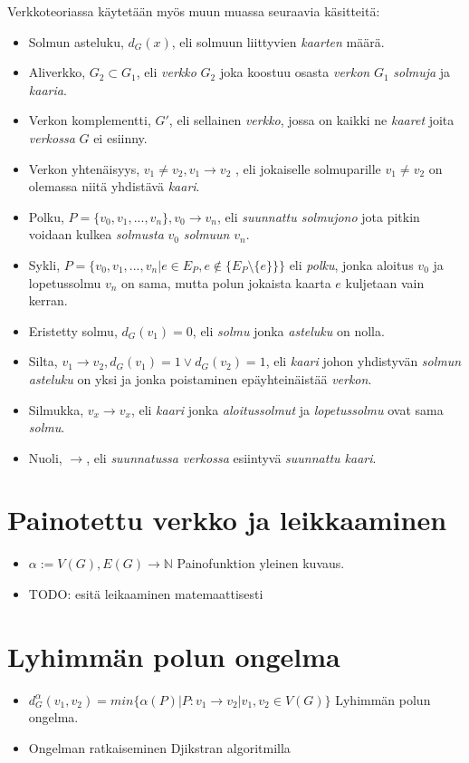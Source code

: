   Verkkoteoriassa käytetään myös muun muassa seuraavia käsitteitä:
  \begin{itemize}
    \item Solmun asteluku, \(d_G(x)\), eli solmuun liittyvien \emph{kaarten} määrä.
    \item Aliverkko, \(G_2 \subset G_1\), eli \emph{verkko} \(G_2\) joka koostuu osasta \emph{verkon} \(G_1\) \emph{solmuja} ja \emph{kaaria}.
    \item Verkon komplementti, \(G'\), eli sellainen \emph{verkko}, jossa on kaikki ne \emph{kaaret} joita \emph{verkossa} \(G\) ei esiinny.
    \item Verkon yhtenäisyys, \(v_1 \neq v_2, v_1 \rightarrow v_2\) , eli jokaiselle solmuparille \(v_1 \neq v_2\) on olemassa niitä yhdistävä \emph{kaari}.
    \item Polku, \(P = \{v_0, v_1, ..., v_n\}, v_0 \rightarrow v_n\), eli \emph{suunnattu solmujono} jota pitkin voidaan kulkea \emph{solmusta} \(v_0\) \emph{solmuun} \(v_n\).
    \item Sykli, \(P = \{v_0, v_1, ..., v_n| e \in E_P, e \notin \{E_P \setminus \{e\} \}\}\) eli \emph{polku}, jonka aloitus \(v_0\) ja lopetussolmu \(v_n\) on sama, mutta polun jokaista kaarta \(e\) kuljetaan vain kerran.
    \item Eristetty solmu, \(d_G(v_1) = 0\), eli \emph{solmu} jonka \emph{asteluku} on nolla.
    \item Silta, \(v_1 \rightarrow v_2, d_G(v_1) = 1 \lor d_G(v_2) = 1\), eli \emph{kaari} johon yhdistyvän \emph{solmun asteluku} on yksi ja jonka poistaminen epäyhteinäistää \emph{verkon}.
    \item Silmukka, \(v_x \rightarrow v_x\), eli \emph{kaari} jonka \emph{aloitussolmut} ja \emph{lopetussolmu} ovat sama \emph{solmu}.
    \item Nuoli, \(\rightarrow\), eli \emph{suunnatussa verkossa} esiintyvä \emph{suunnattu kaari}.
  \end{itemize}

\section{Painotettu verkko ja leikkaaminen} \label{ch:09_painotettu_verkko_ja_leikkaaminen}

  \begin{itemize}
    \item \(\alpha := V(G), E(G) \rightarrow \mathbb{N}\) Painofunktion yleinen kuvaus.
    \item TODO: esitä leikaaminen matemaattisesti
  \end{itemize}

\section{Lyhimmän polun ongelma} \label{ch:09_lyhimman_polun_ongelma}

  \begin{itemize}
    \item \(d_G^\alpha(v_1, v_2) = min\{\alpha(P) | P:v_1 \rightarrow v_2 | v_1, v_2 \in V(G)\}\) Lyhimmän polun ongelma.
    \item Ongelman ratkaiseminen Djikstran algoritmilla
  \end{itemize}

